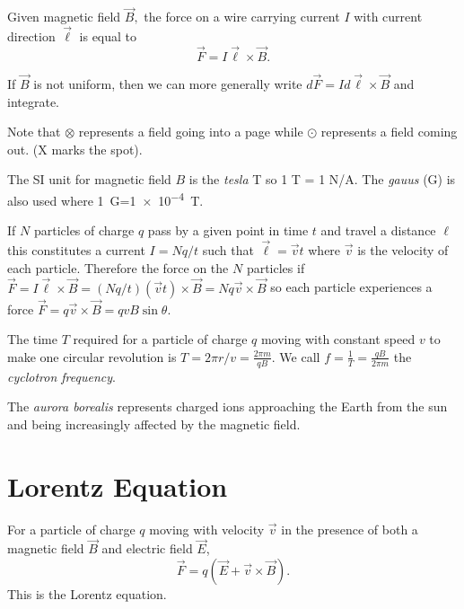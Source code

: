 \begin{definition}
    Given magnetic field $\vec{B},$ the force on a wire carrying current $I$ with current direction $\vec{\ell}$ is equal to $$\vec{F} = I\vec{\ell}\times\vec{B}.$$

    If $\vec{B}$ is not uniform, then we can more generally write $d\vec{F}=Id\vec{\ell}\times\vec{B}$ and integrate.

    Note that $\otimes$ represents a field going into a page while $\odot$ represents a field coming out. (X marks the spot).
\end{definition}
\begin{note}[Tesla]
    The SI unit for magnetic field $B$ is the \emph{tesla} T so 1 T = 1 N/A. The \emph{gauus} (G) is also used where \qty{1}{G}=\qty{1e-4}{T}.
\end{note}
\begin{remark}
    If $N$ particles of charge $q$ pass by a given point in time $t$ and travel a distance $\ell$ this constitutes a current $I = Nq/t$ such that $\vec{\ell} = \vec{v}t$ where $\vec{v}$ is the velocity of each particle. Therefore the force on the $N$ particles if $\vec{F} = I\vec{\ell}\times\vec{B} = (Nq/t)(\vec{v}t)\times\vec{B}=Nq\vec{v}\times\vec{B}$ so each particle experiences a force $\vec{F} = q\vec{v}\times\vec{B} = qvB\sin\theta.$
\end{remark}
\begin{remark}
    The time $T$ required for a particle of charge $q$ moving with constant speed $v$ to make one circular revolution is $T = 2\pi r/v = \frac{2\pi m}{qB}$. We call $f = \frac{1}{T} = \frac{qB}{2 \pi m}$ the \emph{cyclotron frequency}.
\end{remark}
\begin{note}
    The \emph{aurora borealis} represents charged ions approaching the Earth from the sun and being increasingly affected by the magnetic field.
\end{note}

\section{Lorentz Equation}

\begin{remark}
    For a particle of charge $q$ moving with velocity $\vec{v}$ in the presence of both a magnetic field $\vec{B}$ and electric field $\vec{E}$, $$\vec{F} = q(\vec{E} + \vec{v}\times\vec{B}).$$ This is the Lorentz equation.
\end{remark}

